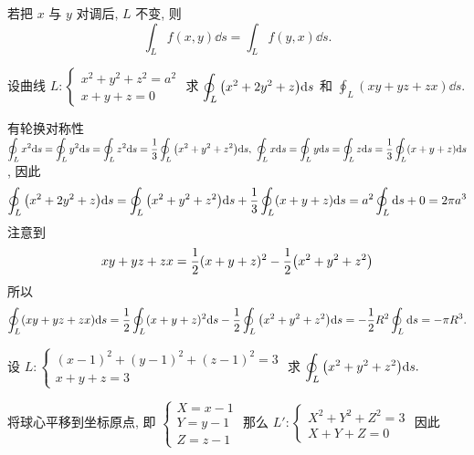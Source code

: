 \begin{theorem}[轮换对称性]
    若把 $x$ 与 $y$ 对调后, $L$ 不变, 则 $$\int_L f(x,y)\dd s=\int_Lf(y,x)\dd s.$$
\end{theorem}

\begin{example}
    设曲线 $L:\begin{cases}
            x^2+y^2+z^2=a^2 \\
            x+y+z=0
        \end{cases}$ 求 $\displaystyle\oint_L\qty(x^2+2y^2+z)\dd s$ 和 $\displaystyle \oint_L(xy+yz+zx)\dd s$.
\end{example}
\begin{solution}
    有轮换对称性 $\displaystyle\oint_Lx^2\dd s=\oint_Ly^2\dd s=\oint_Lz^2\dd s=\dfrac{1}{3}\oint_L\qty(x^2+y^2+z^2)\dd s,~\oint_Lx\dd s=\oint_Ly\dd s=\oint_Lz\dd s=\dfrac{1}{3}\oint_L(x+y+z)\dd s$, 因此
    $$\oint_L\qty(x^2+2y^2+z)\dd s=\oint_L\qty(x^2+y^2+z^2)\dd s+\dfrac{1}{3}\oint_L(x+y+z)\dd s=a^2\oint_L\dd s+0=2\pi a^3$$
    注意到 $$
    xy+yz+zx=\dfrac{1}{2}(x+y+z)^2-\dfrac{1}{2}\qty(x^2+y^2+z^2)
    $$
    所以 $$
    \oint_L(xy+yz+zx)\dd s=\dfrac{1}{2}\oint_L(x+y+z)^2\dd s-\dfrac{1}{2}\oint_L\qty(x^2+y^2+z^2)\dd s=-\dfrac{1}{2}R^2\oint_L\dd s=-\pi R^3.
    $$
\end{solution}

\begin{example}
    设 $L:\begin{cases}
            (x-1)^2+(y-1)^2+(z-1)^2=3 \\
            x+y+z=3
        \end{cases}$ 求 $\displaystyle\oint_L\qty(x^2+y^2+z^2)\dd s.$
\end{example}
\begin{solution}
    将球心平移到坐标原点, 即 $\begin{cases}
            X=x-1 \\
            Y=y-1 \\
            Z=z-1
        \end{cases}$ 那么 $L':\begin{cases}
            X^2+Y^2+Z^2=3 \\
            X+Y+Z=0
        \end{cases}$ 因此
\end{solution}

